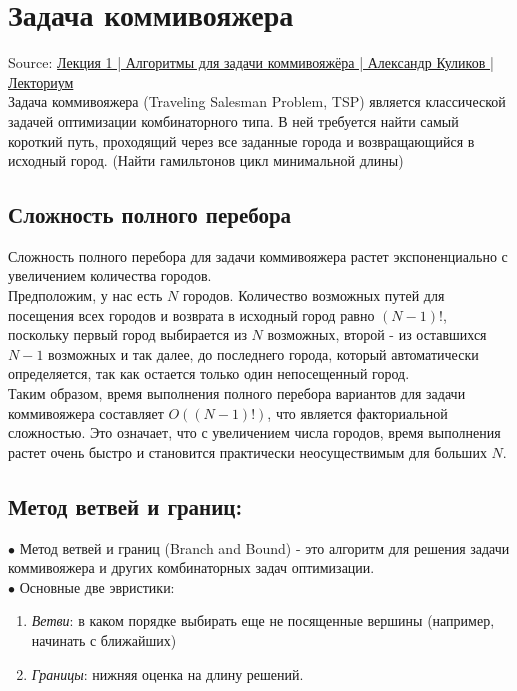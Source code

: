 \newpage
\section{Задача коммивояжера}
    Source: \href{https://www.youtube.com/watch?v=r804FVgvaTo}{Лекция 1 | Алгоритмы для задачи коммивояжёра | Александр Куликов | Лекториум} \\
    
    Задача коммивояжера (Traveling Salesman Problem, TSP) является классической задачей оптимизации комбинаторного типа. В ней требуется найти самый короткий путь, проходящий через все заданные города и возвращающийся в исходный город. (Найти гамильтонов цикл минимальной длины)

    \subsection{Сложность полного перебора}

        Сложность полного перебора для задачи коммивояжера растет экспоненциально с увеличением количества городов.\\

        Предположим, у нас есть $N$ городов. Количество возможных путей для посещения всех городов и возврата в исходный город равно $(N-1)!$, поскольку первый город выбирается из $N$ возможных, второй - из оставшихся $N-1$ возможных и так далее, до последнего города, который автоматически определяется, так как остается только один непосещенный город.\\

        Таким образом, время выполнения полного перебора вариантов для задачи коммивояжера составляет $O((N-1)!)$, что является факториальной сложностью. Это означает, что с увеличением числа городов, время выполнения растет очень быстро и становится практически неосуществимым для больших $N$.
    
    \subsection{Метод ветвей и границ:}
        $\bullet$ Метод ветвей и границ (Branch and Bound) - это алгоритм для решения задачи коммивояжера и других комбинаторных задач оптимизации.\\

        $\bullet$  Основные две эвристики:
        \begin{enumerate}
            \item \textit{Ветви}: в каком порядке выбирать еще не посященные вершины (например, начинать с ближайших)
            \item \textit{Границы}: нижняя оценка на длину решений.\\
        \end{enumerate}

